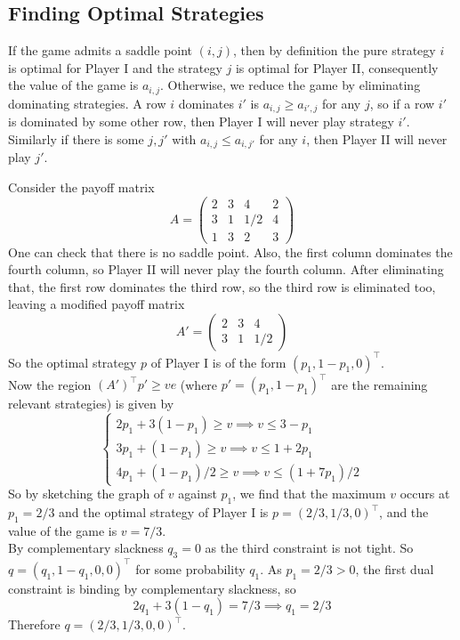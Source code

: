 \subsection{Finding Optimal Strategies}
If the game admits a saddle point $(i,j)$, then by definition the pure strategy $i$ is optimal for Player I and the strategy $j$ is optimal for Player II, consequently the value of the game is $a_{i,j}$.
Otherwise, we reduce the game by eliminating dominating strategies.
A row $i$ dominates $i'$ is $a_{i,j}\ge a_{i',j}$ for any $j$, so if a row $i'$ is dominated by some other row, then Player I will never play strategy $i'$.
Similarly if there is some $j,j'$ with $a_{i,j}\le a_{i,j'}$ for any $i$, then Player II will never play $j'$.
\begin{example}
    Consider the payoff matrix
    $$A=\begin{pmatrix}
        2&3&4&2\\
        3&1&1/2&4\\
        1&3&2&3
    \end{pmatrix}$$
    One can check that there is no saddle point.
    Also, the first column dominates the fourth column, so Player II will never play the fourth column.
    After eliminating that, the first row dominates the third row, so the third row is eliminated too, leaving a modified payoff matrix
    $$A'=\begin{pmatrix}
        2&3&4\\
        3&1&1/2
    \end{pmatrix}$$
    So the optimal strategy $p$ of Player I  is of the form $(p_1,1-p_1,0)^\top$.\\
    Now the region $(A')^\top p'\ge ve$ (where $p'=(p_1,1-p_1)^\top$ are the remaining relevant strategies) is given by
    $$\begin{cases}
        2p_1+3(1-p_1)\ge v\implies v\le 3-p_1\\
        3p_1+(1-p_1)\ge v\implies v\le 1+2p_1\\
        4p_1+(1-p_1)/2\ge v\implies v\le (1+7p_1)/2
    \end{cases}$$
    So by sketching the graph of $v$ against $p_1$, we find that the maximum $v$ occurs at $p_1=2/3$ and the optimal strategy of Player I is $p=(2/3,1/3,0)^\top$, and the value of the game is $v=7/3$.\\
    By complementary slackness $q_3=0$ as the third constraint is not tight.
    So $q=(q_1,1-q_1,0,0)^\top$ for some probability $q_1$.
    As $p_1=2/3>0$, the first dual constraint is binding by complementary slackness, so
    $$2q_1+3(1-q_1)=7/3\implies q_1=2/3$$
    Therefore $q=(2/3,1/3,0,0)^\top$.
\end{example}
